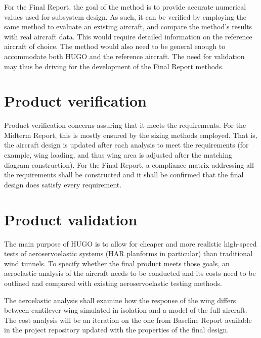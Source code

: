 For the Final Report, the goal of the method is to provide accurate numerical values used for subsystem design. As such, it can be verified by employing the same method to evaluate an existing aircraft, and compare the method's results with real aircraft data. This would require detailed information on the reference aircraft of choice. The method would also need to be general enough to accommodate both HUGO and the reference aircraft. The need for validation may thus be driving for the development of the Final Report methods.

\section{Product verification}
\label{sec: Product verification}

Product verification concerns assuring that it meets the requirements. For the Midterm Report, this is mostly ensured by the sizing methods employed. That is, the aircraft design is updated after each analysis to meet the requirements (for example, wing loading, and thus wing area is adjusted after the matching diagram construction). For the Final Report, a compliance matrix addressing all the requirements shall be constructed and it shall be confirmed that the final design does satisfy every requirement.

\section{Product validation}
\label{sec: Product validation}
The main purpose of HUGO is to allow for cheaper and more realistic high-speed tests of aeroservoelastic systems (HAR planforms in particular) than traditional wind tunnels. To specify whether the final product meets those goals, an aeroelastic analysis of the aircraft needs to be conducted and its costs need to be outlined and compared with existing aeroservoelastic testing methods.

The aeroelastic analysis shall examine how the response of the wing differs between cantilever wing simulated in isolation and a model of the full aircraft. The cost analysis will be an iteration on the one from Baseline Report available in the project repository  updated with the properties of the final design.
